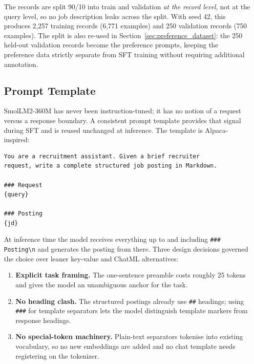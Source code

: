 \documentclass[../main.tex]{subfiles}
\begin{document}
The records are split 90/10 into train and validation \emph{at the record level}, not at the query level, so no job description leaks across the split. With seed 42, this produces 2{,}257 training records (6{,}771 examples) and 250 validation records (750 examples). The split is also re-used in Section~\ref{sec:preference_dataset}: the 250 held-out validation records become the preference prompts, keeping the preference data strictly separate from SFT training without requiring additional annotation.

\subsection{Prompt Template}
\label{sec:prompt_template}

SmolLM2-360M has never been instruction-tuned; it has no notion of a request versus a response boundary. A consistent prompt template provides that signal during SFT and is reused unchanged at inference. The template is Alpaca-inspired:

\begin{verbatim}
You are a recruitment assistant. Given a brief recruiter
request, write a complete structured job posting in Markdown.

### Request
{query}

### Posting
{jd}
\end{verbatim}

At inference time the model receives everything up to and including \texttt{\#\#\# Posting\textbackslash n} and generates the posting from there. Three design decisions governed the choice over leaner key-value and ChatML alternatives:

\begin{enumerate}
  \item \textbf{Explicit task framing.} The one-sentence preamble costs roughly 25 tokens and gives the model an unambiguous anchor for the task.
  \item \textbf{No heading clash.} The structured postings already use \texttt{\#\#} headings; using \texttt{\#\#\#} for template separators lets the model distinguish template markers from response headings.
  \item \textbf{No special-token machinery.} Plain-text separators tokenise into existing vocabulary, so no new embeddings are added and no chat template needs registering on the tokenizer.
\end{enumerate}
\end{document}

